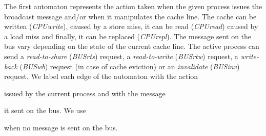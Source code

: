 The first automaton represents the action taken when the given process
issues the broadcast message and/or when it manipulates the cache
line.
%
The cache can be written (\emph{CPUwrite}), caused by a store miss, it
can be read (\emph{CPUread}) caused by a load miss and finally, it can
be replaced (\emph{CPUrepl}).
%
The message sent on the bus vary depending on the state of the current
cache line. The active process can send a \emph{read-to-share}
(\emph{BUSrts}) request, a \emph{read-to-write} (\emph{BUSrtw})
request, a \emph{write-back} (\emph{BUSwb}) request (in case of cache
eviction) or an \emph{invalidate} (\emph{BUSinv}) request. We label
each edge of the automaton with the action %
issued by the current process
and with the message %
 it sent on the bus. We use %
when no message is sent on the bus.

